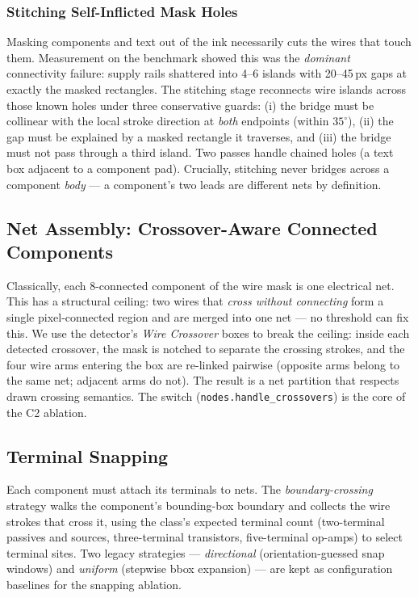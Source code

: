 \subsubsection{Stitching Self-Inflicted Mask Holes}
Masking components and text out of the ink necessarily cuts the wires
that touch them. Measurement on the benchmark showed this was the
\emph{dominant} connectivity failure: supply rails shattered into 4--6
islands with 20--45\,px gaps at exactly the masked rectangles. The
stitching stage reconnects wire islands across those known holes under
three conservative guards: (i) the bridge must be collinear with the
local stroke direction at \emph{both} endpoints (within
$35^\circ$), (ii) the gap must be explained by a masked rectangle it
traverses, and (iii) the bridge must not pass through a third island.
Two passes handle chained holes (a text box adjacent to a component
pad). Crucially, stitching never bridges across a component
\emph{body} — a component's two leads are different nets by
definition.

\subsection{Net Assembly: Crossover-Aware Connected Components}
\label{sec:method-nodes}
Classically, each 8-connected component of the wire mask is one
electrical net. This has a structural ceiling: two wires that
\emph{cross without connecting} form a single pixel-connected region
and are merged into one net — no threshold can fix this. We use the
detector's \emph{Wire Crossover} boxes to break the ceiling: inside
each detected crossover, the mask is notched to separate the crossing
strokes, and the four wire arms entering the box are re-linked
pairwise (opposite arms belong to the same net; adjacent arms do not).
The result is a net partition that respects drawn crossing semantics.
The switch (\texttt{nodes.handle\_crossovers}) is the core of the C2
ablation.

\subsection{Terminal Snapping}
\label{sec:method-snap}
Each component must attach its terminals to nets. The
\emph{boundary-crossing} strategy walks the component's bounding-box
boundary and collects the wire strokes that cross it, using the
class's expected terminal count (two-terminal passives and sources,
three-terminal transistors, five-terminal op-amps) to select terminal
sites. Two legacy strategies — \emph{directional} (orientation-guessed
snap windows) and \emph{uniform} (stepwise bbox expansion) — are kept
as configuration baselines for the snapping ablation.

